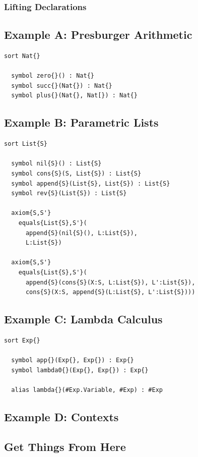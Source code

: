 \documentclass[UTF8,11pt]{article}
\theoremstyle{plain}
\theoremstyle{definition}
\theoremstyle{remark}
\begin{document}
\subsubsection{Lifting Declarations}

\subsection{Example A: Presburger Arithmetic}
\begin{lstlisting}[language=kore]
  sort Nat{}
  
  symbol zero{}() : Nat{}
  symbol succ{}(Nat{}) : Nat{}
  symbol plus{}(Nat{}, Nat[}) : Nat{}
\end{lstlisting}
\subsection{Example B: Parametric Lists}
\begin{lstlisting}[language=kore]
  sort List{S}
  
  symbol nil{S}() : List{S}
  symbol cons{S}(S, List{S}) : List{S}
  symbol append{S}(List{S}, List{S}) : List{S}
  symbol rev{S}(List{S}) : List{S}
  
  axiom{S,S'} 
    equals{List{S},S'}(
      append{S}(nil{S}(), L:List{S}),
      L:List{S})
      
  axiom{S,S'}
    equals{List{S},S'}(
      append{S}(cons{S}(X:S, L:List{S}), L':List{S}),
      cons{S}(X:S, append{S}(L:List{S}, L':List{S})))
\end{lstlisting}

\subsection{Example C: Lambda Calculus}

\begin{lstlisting}[language=kore]
  sort Exp{}
  
  symbol app{}(Exp{}, Exp{}) : Exp{}
  symbol lambda0{}(Exp{}, Exp{}) : Exp{}
  
  alias lambda{}(#Exp.Variable, #Exp) : #Exp
\end{lstlisting}

\subsection{Example D: Contexts}

\subsection{Get Things From Here}
\end{document}
